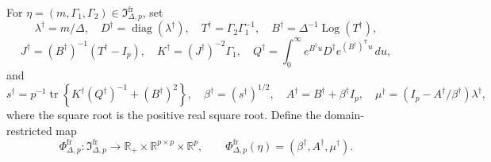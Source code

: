 For \(\eta=(m,\Gamma_1,\Gamma_2)\in\mathfrak I_{\Delta,p}^{\mathrm{fr}}\), set
\[
 \lambda^\dagger=m/\Delta,\quad D^\dagger=\operatorname{diag}(\lambda^\dagger),\quad
 T^\dagger=\Gamma_2\Gamma_1^{-1},\quad
 B^\dagger=\Delta^{-1}\operatorname{Log}(T^\dagger),
\]
\[
 J^\dagger=(B^\dagger)^{-1}(T^\dagger-I_p),\quad
 K^\dagger=(J^\dagger)^{-2}\Gamma_1,\quad
 Q^\dagger=\int_0^\infty e^{B^\dagger u}D^\dagger e^{(B^\dagger)^{\mathsf T}u}\,du,
\]
and
\[
 s^\dagger=p^{-1}\operatorname{tr}\!\left\{K^\dagger(Q^\dagger)^{-1}+(B^\dagger)^2\right\},\quad
 \beta^\dagger=(s^\dagger)^{1/2},\quad
 A^\dagger=B^\dagger+\beta^\dagger I_p,\quad
 \mu^\dagger=(I_p-A^\dagger/\beta^\dagger)\lambda^\dagger,
\]
where the square root is the positive real square root. Define the domain-restricted map
\[
 \Phi^{\mathrm{fr}}_{\Delta,p}:\mathfrak I_{\Delta,p}^{\mathrm{fr}}\longrightarrow
 \mathbb R_+\times\mathbb R^{p\times p}\times\mathbb R^p,
 \qquad
 \Phi^{\mathrm{fr}}_{\Delta,p}(\eta)=(\beta^\dagger,A^\dagger,\mu^\dagger).
\]